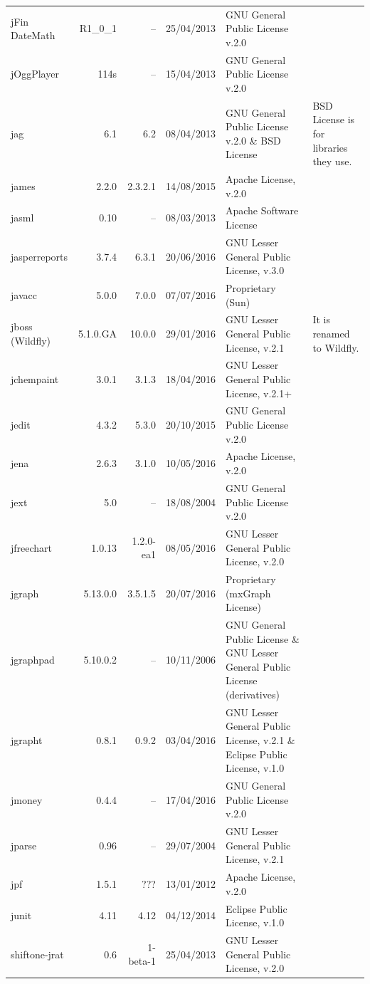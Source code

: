 \documentclass{IEEEtran}
\begin{document}
\begin{table}[h]
\begin{tabular}{l|r|r|c|p{5cm}|p{3cm}}
	jFin DateMath & R1\_0\_1 & -- & 25/04/2013  & GNU General Public License v.2.0 \\
	jOggPlayer & 114s & -- &  15/04/2013   & GNU General Public License v.2.0 \\
	jag & 6.1 & 6.2 & 08/04/2013   & GNU General Public License v.2.0 \& BSD License & BSD License is for libraries they use. \\
	james & 2.2.0 & 2.3.2.1 & 14/08/2015 & Apache License, v.2.0 \\
	jasml & 0.10 & -- & 08/03/2013 & Apache Software License \\
	jasperreports & 3.7.4 & 6.3.1 & 20/06/2016 & GNU Lesser General Public License, v.3.0 &  \\
	javacc & 5.0.0 & 7.0.0 & 07/07/2016 & Proprietary (Sun) \\
	jboss (Wildfly) & 5.1.0.GA & 10.0.0 & 29/01/2016 & GNU Lesser General Public License, v.2.1 & It is renamed to Wildfly. \\
	jchempaint & 3.0.1 & 3.1.3 & 18/04/2016 & GNU Lesser General Public License, v.2.1+ &  \\
	jedit & 4.3.2 & 5.3.0 & 20/10/2015  & GNU General Public License v.2.0 &  \\
	jena & 2.6.3 & 3.1.0 & 10/05/2016 & Apache License, v.2.0 \\
	jext & 5.0 & -- & 18/08/2004   & GNU General Public License v.2.0 &  \\
	jfreechart & 1.0.13 & 1.2.0-ea1 & 08/05/2016  & GNU Lesser General Public License, v.2.0 &   \\
	jgraph & 5.13.0.0 & 3.5.1.5 & 20/07/2016 & Proprietary (mxGraph License) \\
	jgraphpad & 5.10.0.2 & -- & 10/11/2006 & GNU General Public License  \& GNU Lesser General Public License (derivatives) \\
	jgrapht & 0.8.1 & 0.9.2 & 03/04/2016 & GNU Lesser General Public License, v.2.1 \& Eclipse Public License, v.1.0 \\
	jmoney & 0.4.4 & -- & 17/04/2016 & GNU General Public License v.2.0 &  \\
	jparse & 0.96 & -- & 29/07/2004 & GNU Lesser General Public License, v.2.1 \\
	jpf & 1.5.1 & ??? & 13/01/2012 & Apache License, v.2.0 \\
	junit & 4.11 & 4.12 & 04/12/2014 & Eclipse Public License, v.1.0 \\
	shiftone-jrat & 0.6 & 1-beta-1 & 25/04/2013 & GNU Lesser General Public License, v.2.0 &  \\
	\hline 
\end{tabular} 
\end{table}
\end{document}
